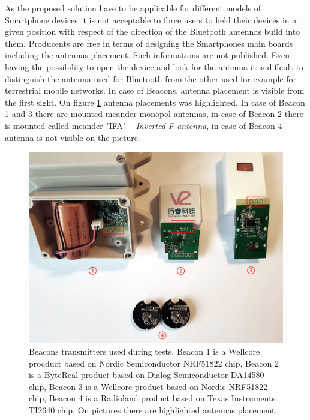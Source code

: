 \documentclass[../main.tex]{subfiles}
\begin{document}
As the proposed solution have to be applicable for different models of Smartphone devices it is not acceptable to force users to held their devices in a given position with respect of the direction of the Bluetooth antennas build into them. Producents are free in terms of designing the Smartphones main boards including the antennas placement. Such informations are not published. Even having the possibility to open the device and look for the antenna it is diffcult to distinguish the antenna used for Bluetooth from the other used for example for terrestrial mobile networks. In case of Beacons, antenna placement is visible from the first sight. On figure \ref{fig:beacons_used_in_tests} antenna placements was highlighted. In case of Beacon 1 and 3 there are mounted meander monopol antennas, in case of Beacon 2 there is mounted called meander "IFA" -- \textit{Inverted-F antenna}, in case of Beacon 4 antenna is not visible on the picture.

\begin{figure}[!htbp]
\includegraphics[width=\textwidth, keepaspectratio]{pictures/beacons_used_in_tests.pdf}
\centering
\caption{Beacons transmitters used during tests. Beacon 1 is a Wellcore procduct based on Nordic Semiconductor NRF51822 chip, Beacon 2 is a ByteReal product based on Dialog Semiconductor DA14580 chip, Beacon 3 is a Wellcore product based on Nordic NRF51822 chip, Beacon 4 is a Radioland product based on Texas Instruments TI2640 chip. On pictures there are highlighted antennas placement.}
\label{fig:beacons_used_in_tests}
\end{figure}
\end{document}
